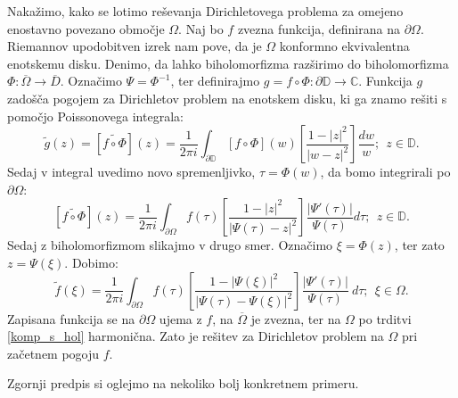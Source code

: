 \documentclass[mat1]{fmfdelo}
\begin{document}
    Nakažimo, kako se lotimo reševanja Dirichletovega problema za omejeno enostavno povezano območje $\Omega$. Naj bo $f$ zvezna funkcija, definirana na $\partial \Omega$. 
    Riemannov upodobitven izrek nam pove, da je $\Omega$ konformno ekvivalentna enotskemu disku. Denimo, da lahko biholomorfizma razširimo do biholomorfizma $\Phi: \overline{\Omega} \to \overline{D}$. 
    Označimo $\Psi = \Phi^{-1}$, ter definirajmo $g = f \circ \Phi: \partial \mathbb{D} \to \mathbb{C}$. Funkcija $g$ zadošča pogojem za Dirichletov problem na enotskem disku, ki ga znamo rešiti s pomočjo Poissonovega integrala:
    $$
    \widetilde{g}(z) = [\widetilde{f \circ \Phi}](z) = \frac{1}{2\pi i}\int_{\partial \mathbb{D}}{[f \circ \Phi](w) \left[\frac{1 - |z|^2}{|w - z|^2}\right]\frac{dw}{w}};~~z \in \mathbb{D}. 
    $$
    Sedaj v integral uvedimo novo spremenljivko, $\tau = \Phi(w)$, da bomo integrirali po $\partial \Omega$: 
    $$
    [\widetilde{f \circ \Phi}](z) = \frac{1}{2\pi i}\int_{\partial \Omega}{f(\tau) \left[\frac{1 - |z|^2}{|\Psi(\tau) - z|^2}\right]\frac{|\Psi'(\tau)|}{\Psi(\tau)}d \tau};~~z \in \mathbb{D}. 
    $$
    Sedaj z biholomorfizmom slikajmo v drugo smer. Označimo $\xi = \Phi(z)$, ter zato $z = \Psi(\xi)$. Dobimo:
    \begin{equation}
        \label{eno_pov_obm}
    \widetilde{f}(\xi) = \frac{1}{2\pi i}\int_{\partial \Omega}{f(\tau) \left[\frac{1 - |\Psi(\xi)|^2}{|\Psi(\tau) - \Psi(\xi)|^2}\right]\frac{|\Psi'(\tau)|}{\Psi(\tau)}~d \tau};~~\xi \in \Omega. 
    \end{equation}
    Zapisana funkcija se na $\partial \Omega$ ujema z $f$, na $\overline{\Omega}$ je zvezna, ter na $\Omega$ po trditvi \ref{komp_s_hol} harmonična. Zato je rešitev za Dirichletov problem na $\Omega$ pri začetnem pogoju $f$.

    Zgornji predpis si oglejmo na nekoliko bolj konkretnem primeru. 
    
\end{document}
